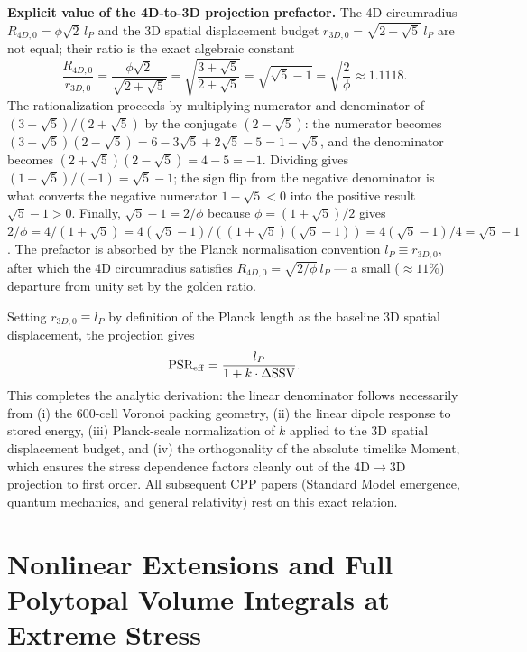 \documentclass[11pt,letterpaper]{article}
\begin{document}
\textbf{Explicit value of the 4D-to-3D projection prefactor.}
The 4D circumradius $R_{4D,0} = \phi\sqrt{2}\,l_P$ and the 3D
spatial displacement budget $r_{3D,0} = \sqrt{2+\sqrt{5}}\,l_P$
are not equal; their ratio is the exact algebraic constant
\begin{equation}
  \frac{R_{4D,0}}{r_{3D,0}}
  = \frac{\phi\sqrt{2}}{\sqrt{2+\sqrt{5}}}
  = \sqrt{\frac{3+\sqrt{5}}{2+\sqrt{5}}}
  = \sqrt{\sqrt{5}-1}
  = \sqrt{\frac{2}{\phi}}
  \approx 1.1118.
  \label{eq:4D3D_prefactor_D}
\end{equation}
The rationalization proceeds by multiplying numerator and denominator of 
$(3+\sqrt{5})/(2+\sqrt{5})$ by the conjugate $(2-\sqrt{5})$:
the numerator becomes $(3+\sqrt{5})(2-\sqrt{5}) = 6 - 3\sqrt{5} + 2\sqrt{5} - 5 
= 1 - \sqrt{5}$, and the denominator becomes 
$(2+\sqrt{5})(2-\sqrt{5}) = 4 - 5 = -1$. Dividing gives 
$(1-\sqrt{5})/(-1) = \sqrt{5}-1$; the sign flip from the negative 
denominator is what converts the negative numerator $1-\sqrt{5} < 0$ 
into the positive result $\sqrt{5}-1 > 0$. Finally, 
$\sqrt{5}-1 = 2/\phi$ because $\phi = (1+\sqrt{5})/2$ gives 
$2/\phi = 4/(1+\sqrt{5}) = 4(\sqrt{5}-1)/((1+\sqrt{5})(\sqrt{5}-1)) 
= 4(\sqrt{5}-1)/4 = \sqrt{5}-1$.
The prefactor is absorbed by the Planck normalisation convention
$l_P \equiv r_{3D,0}$, after which the 4D circumradius satisfies
$R_{4D,0} = \sqrt{2/\phi}\,l_P$ — a small (${\approx}11\%$) departure
from unity set by the golden ratio.

Setting 
$r_{3D,0} \equiv l_P$ by definition of the Planck length as the 
baseline 3D spatial displacement, the projection gives
\begin{equation}
\text{PSR}_{\rm eff} = \frac{l_P}{1 + k \cdot \Delta\text{SSV}}.
\label{eq:psr_projected}
\end{equation}
This completes the analytic derivation: the linear denominator follows 
necessarily from (i) the 600-cell Voronoi packing geometry, (ii) the 
linear dipole response to stored energy, (iii) Planck-scale 
normalization of $k$ applied to the 3D spatial displacement budget, 
and (iv) the orthogonality of the absolute timelike Moment, which 
ensures the stress dependence factors cleanly out of the 4D$\to$3D 
projection to first order. All subsequent CPP papers (Standard Model 
emergence, quantum mechanics, and general relativity) rest on this 
exact relation.

\section{Nonlinear Extensions and Full Polytopal Volume Integrals at Extreme Stress}\label{app:E}
\end{document}
